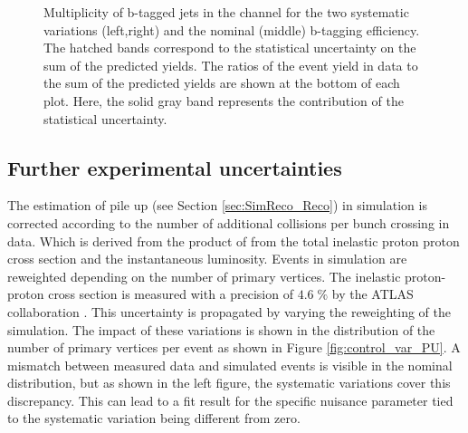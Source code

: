 \begin{figure}[htbp!]
\begin{center}
\caption{Multiplicity of b-tagged jets in the \emu channel for the two systematic variations (left,right) and the nominal (middle) b-tagging efficiency.
The hatched bands correspond to the statistical uncertainty on the sum of the predicted yields. 
        The ratios of the event yield in data to the sum of the predicted yields are
        shown at the bottom of each plot. Here, the solid gray band
        represents the contribution of the statistical uncertainty.
  \label{fig:control_var_BTAGH}}
  \end{center}
\end{figure}


\subsection{Further experimental uncertainties}

The estimation of pile up (see Section \ref{sec:SimReco_Reco}) in simulation is corrected according to the number of additional collisions per bunch crossing in data. Which is derived from the product of from the total inelastic proton proton cross section and the instantaneous luminosity.  
Events in simulation are reweighted depending on the number of primary vertices. 
The inelastic proton-proton cross section is measured with a precision of $4.6 \; \%$ by the ATLAS collaboration \cite{Aaboud:2016mmw}. 
This uncertainty is propagated by varying the reweighting of the simulation.
The impact of these variations is shown in the distribution of the number of primary vertices per event as shown in Figure \ref{fig:control_var_PU}.
A mismatch between measured data and simulated events is visible in the nominal distribution, but as shown in the left figure, the systematic variations cover this discrepancy.
This can lead to a fit result for the specific nuisance parameter tied to the systematic variation being different from zero.

